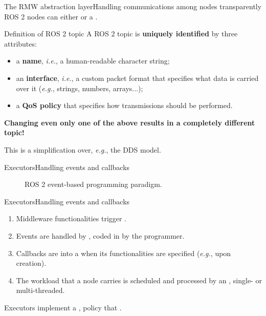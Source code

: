 \begin{frame}{The RMW abstraction layer}{Handling communications among nodes transparently}
  \justifying
	ROS 2 nodes can either  or  a .
	\begin{block}{Definition of ROS 2 topic}
    \justifying
		A ROS 2 topic is \textbf{uniquely identified} by three attributes:
		\begin{itemize}
			\item a \textbf{name}, \emph{i.e.}, a human-readable character string;
			\item an \textbf{interface}, \emph{i.e.}, a custom packet format that specifies what data is carried over it (\emph{e.g.}, strings, numbers, arrays...);
			\item a \textbf{QoS policy} that specifies how transmissions should be performed.
		\end{itemize}
	\end{block}
	\begin{block}{}
		\centering
		\textbf{Changing even only one of the above results in a completely different topic!}
	\end{block}
  This is a simplification over, \emph{e.g.}, the DDS model.
\end{frame}

\begin{frame}{Executors}{Handling events and callbacks}
	\begin{figure}
		\centering
		
		\label{fig:executorscheme}
		\caption{ROS 2 event-based programming paradigm.}
	\end{figure}
\end{frame}
\begin{frame}{Executors}{Handling events and callbacks}
  \justifying
	\begin{enumerate}
		\item Middleware functionalities trigger .
		\item Events are handled by , coded in  by the programmer.
		\item Callbacks are  into a  when its functionalities are specified (\emph{e.g.}, upon creation).
		\item The workload that a node carries is scheduled and processed by an , single- or multi-threaded.
	\end{enumerate}
	\begin{alertblock}{}
		\centering
		Executors implement a ,  policy that .
	\end{alertblock}
\end{frame}

